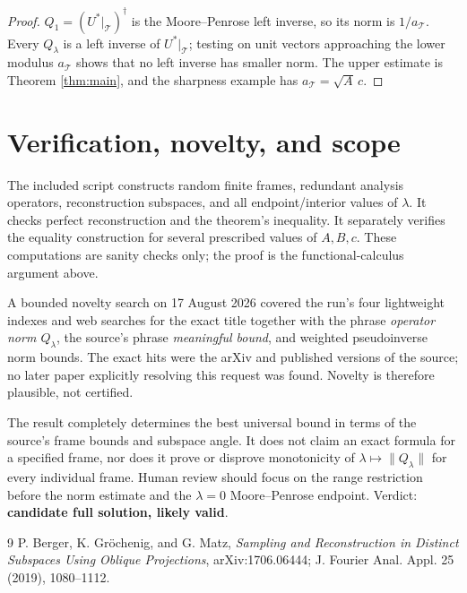 \documentclass[11pt]{article}
\newcommand{\Tt}{\mathcal T}
\begin{document}
\begin{proof}
$Q_1=(U^*|_{\Tt})^\dagger$ is the Moore--Penrose left inverse, so its norm
is $1/a_{\Tt}$.  Every $Q_\lambda$ is a left inverse of $U^*|_{\Tt}$;
testing on unit vectors approaching the lower modulus $a_{\Tt}$ shows that
no left inverse has smaller norm.  The upper estimate is Theorem
\ref{thm:main}, and the sharpness example has
$a_{\Tt}=\sqrt A\,c$.
\end{proof}

\section{Verification, novelty, and scope}

The included script constructs random finite frames, redundant analysis
operators, reconstruction subspaces, and all endpoint/interior values of
$\lambda$.  It checks perfect reconstruction and the theorem's inequality.
It separately verifies the equality construction for several prescribed
values of $A,B,c$.  These computations are sanity checks only; the proof is
the functional-calculus argument above.

A bounded novelty search on 17 August 2026 covered the run's four lightweight
indexes and web searches for the exact title together with the phrase
\emph{operator norm $Q_\lambda$}, the source's phrase
\emph{meaningful bound}, and weighted pseudoinverse norm bounds.  The exact
hits were the arXiv and published versions of the source; no later paper
explicitly resolving this request was found.  Novelty is therefore plausible,
not certified.

The result completely determines the best universal bound in terms of the
source's frame bounds and subspace angle.  It does not claim an exact formula
for a specified frame, nor does it prove or disprove monotonicity of
$\lambda\mapsto\|Q_\lambda\|$ for every individual frame.  Human review
should focus on the range restriction before the norm estimate and the
$\lambda=0$ Moore--Penrose endpoint.  Verdict:
\textbf{candidate full solution, likely valid}.

\begin{thebibliography}{9}
P. Berger, K. Gr\"ochenig, and G. Matz,
\emph{Sampling and Reconstruction in Distinct Subspaces Using Oblique
Projections}, arXiv:1706.06444; J. Fourier Anal. Appl. 25 (2019), 1080--1112.
\end{thebibliography}
\end{document}
